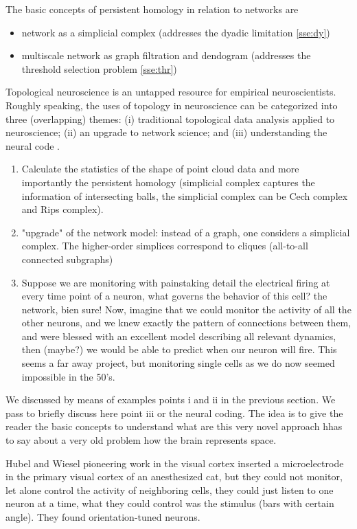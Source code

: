 \documentclass[onecollarge,runningheads]{svjour2}
\begin{document}
The basic concepts of persistent homology in relation to networks are
\begin{itemize}
\item network as a simplicial complex (addresses the dyadic limitation \ref{sse:dy})
\item multiscale network as graph filtration and dendogram (addresses the threshold selection problem \ref{sse:thr})
\end{itemize}

Topological neuroscience is an untapped resource for empirical neuroscientists.
Roughly speaking, the uses of topology in neuroscience can be categorized into three (overlapping) themes: (i) traditional topological data analysis applied to neuroscience; (ii) an upgrade to network science; and (iii) understanding the neural code \cite{curto2016can}.

\begin{enumerate}
\item  Calculate the statistics of the shape of point cloud data and more importantly the persistent homology (simplicial complex captures the information of intersecting balls, the simplicial complex can be Cech complex and Rips complex).
\item  "upgrade" of the network model: instead of a graph, one considers a simplicial complex. The higher-order simplices correspond to cliques (all-to-all connected subgraphs)
\item Suppose we are monitoring with painstaking detail the electrical firing at every time point of a neuron, what governs the behavior of this cell? the network, bien sure!  Now, imagine that we could monitor the activity of all the other neurons, and we knew exactly the pattern of connections between them, and were blessed with an excellent model describing all relevant dynamics, then (maybe?) we would be able to predict when our neuron will fire. This seems a far away project, but monitoring  single cells as we do now seemed impossible in the 50's. %
\end{enumerate}

We discussed by means of examples points i and ii in the previous section. We pass to briefly  discuss here point iii or the neural coding. The idea is to give the reader the basic concepts  to understand what are this very novel approach hhas to say about a very old problem how the brain represents space.

Hubel and Wiesel pioneering work in the visual cortex inserted a microelectrode in the primary visual cortex of an anesthesized cat, but they could not monitor, let alone control the activity of neighboring cells, they could just listen to one neuron at a time, what they could control was the stimulus (bars with certain angle). They found orientation-tuned neurons.
\end{document}
